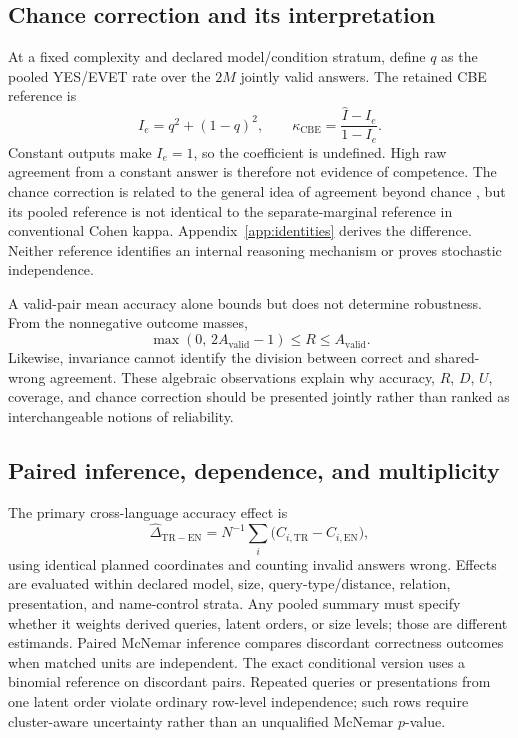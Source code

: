 \subsection{Chance correction and its interpretation}

At a fixed complexity and declared model/condition stratum, define $q$ as the pooled YES/EVET rate over the
$2M$ jointly valid answers. The retained CBE reference is
\begin{equation}
  I_e = q^2 + (1 - q)^2,
  \qquad
  \kappa_{\mathrm{CBE}} = \frac{\widehat{I} - I_e}{1 - I_e}.
  \label{eq:kappa}
\end{equation}
Constant outputs make $I_e = 1$, so the coefficient is undefined. High raw agreement from a constant answer
is therefore not evidence of competence. The chance correction is related to the general idea of agreement
beyond chance \citep{cohen1960kappa}, but its pooled reference is not identical to the separate-marginal
reference in conventional Cohen kappa. Appendix~\ref{app:identities} derives the difference. Neither
reference identifies an internal reasoning mechanism or proves stochastic independence.

A valid-pair mean accuracy alone bounds but does not determine robustness. From the nonnegative outcome
masses,
\begin{equation}
  \max(0,\, 2A_{\mathrm{valid}} - 1) \le R \le A_{\mathrm{valid}}.
  \label{eq:bounds}
\end{equation}
Likewise, invariance cannot identify the division between correct and shared-wrong agreement. These
algebraic observations explain why accuracy, $R$, $D$, $U$, coverage, and chance correction should be
presented jointly rather than ranked as interchangeable notions of reliability.

\subsection{Paired inference, dependence, and multiplicity}

The primary cross-language accuracy effect is
\begin{equation}
  \widehat{\Delta}_{\mathrm{TR-EN}} = N^{-1} \sum_i \bigl(C_{i,\mathrm{TR}} - C_{i,\mathrm{EN}}\bigr),
  \label{eq:delta}
\end{equation}
using identical planned coordinates and counting invalid answers wrong. Effects are evaluated within
declared model, size, query-type/distance, relation, presentation, and name-control strata. Any pooled
summary must specify whether it weights derived queries, latent orders, or size levels; those are different
estimands. Paired McNemar inference \citep{mcnemar1947} compares discordant correctness outcomes when
matched units are independent. The exact conditional version uses a binomial reference on discordant pairs.
Repeated queries or presentations from one latent order violate ordinary row-level independence; such rows
require cluster-aware uncertainty rather than an unqualified McNemar $p$-value.


